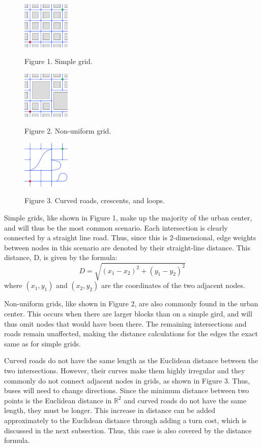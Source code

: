 \documentclass[letter,10pt]{article}
\begin{document}
\begin{figure}
    \centering
    \includegraphics[width=0.2\textwidth]{StreetBlocks1b}
    \footnotesize
    
    Figure 1. Simple grid.
    
    \includegraphics[width=0.2\textwidth]{StreetBlocks2b}
    
    Figure 2. Non-uniform grid.
    
    \includegraphics[width=0.2\textwidth]{StreetBlocks3b}
    
    Figure 3. Curved roads, crescents, and loops.
    \vspace{-2cm}
\end{figure}

Simple grids, like shown in Figure 1, make up the majority of the urban center, and will thus be the most common scenario. Each intersection is clearly connected by a straight line road. Thus, since this is 2-dimensional, edge weights between nodes in this scenario are denoted by their straight-line distance. This distance, D, is given by the formula:
$$D = \sqrt{(x_1-x_2)^2 + (y_1-y_2)^2}$$
where $(x_1,y_1)$ and $(x_2,y_2)$ are the coordinates of the two adjacent nodes.

Non-uniform grids, like shown in Figure 2, are also commonly found in the urban center. This occurs when there are larger blocks than on a simple gird, and will thus omit nodes that would have been there. The remaining intersections and roads remain unaffected, making the distance calculations for the edges the exact same as for simple grids.

Curved roads do not have the same length as the Euclidean distance between the two intersections. However, their curves make them highly irregular and they commonly do not connect adjacent nodes in grids, as shown in Figure 3. Thus, buses will need to change directions. Since the minimum distance between two points is the Euclidean distance in $\mathbb{R}^2$ and curved roads do not have the same length, they must be longer. This increase in distance can be added  approximately to the Euclidean distance through adding a turn cost, which is discussed in the next subsection. Thus, this case is also covered by the distance formula.
\end{document}
